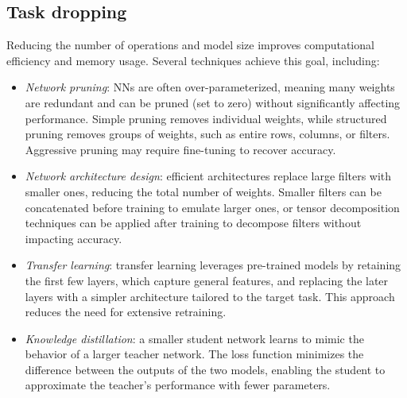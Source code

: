 \subsection{Task dropping}
Reducing the number of operations and model size improves computational efficiency and memory usage. 
Several techniques achieve this goal, including:
\begin{itemize}
    \item \textit{Network pruning}: NNs are often over-parameterized, meaning many weights are redundant and can be pruned (set to zero) without significantly affecting performance. 
        Simple pruning removes individual weights, while structured pruning removes groups of weights, such as entire rows, columns, or filters. 
        Aggressive pruning may require fine-tuning to recover accuracy.
    \item \textit{Network architecture design}: efficient architectures replace large filters with smaller ones, reducing the total number of weights. 
        Smaller filters can be concatenated before training to emulate larger ones, or tensor decomposition techniques can be applied after training to decompose filters without impacting accuracy.
    \item \textit{Transfer learning}: transfer learning leverages pre-trained models by retaining the first few layers, which capture general features, and replacing the later layers with a simpler architecture tailored to the target task. 
        This approach reduces the need for extensive retraining.
    \item \textit{Knowledge distillation}: a smaller student network learns to mimic the behavior of a larger teacher network. 
        The loss function minimizes the difference between the outputs of the two models, enabling the student to approximate the teacher's performance with fewer parameters.
\end{itemize}